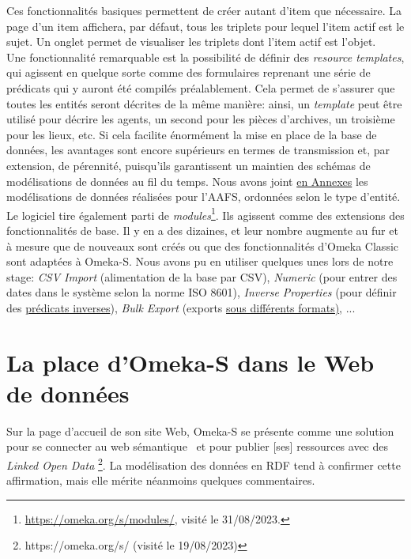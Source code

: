 \documentclass[a4paper,12pt,twoside]{book}
\begin{document}
Ces fonctionnalités basiques permettent de créer autant d'item que nécessaire. La page d'un item affichera, par défaut, tous les triplets pour lequel l'item actif est le sujet. Un onglet permet de visualiser les triplets dont l'item actif est l'objet.\\

Une fonctionnalité remarquable est la possibilité de définir des \textit{resource templates}, qui agissent en quelque sorte comme des formulaires reprenant une série de prédicats qui y auront été compilés préalablement. Cela permet de s'assurer que toutes les entités seront décrites de la même manière: ainsi, un \textit{template} peut être utilisé pour décrire les agents, un second pour les pièces d'archives, un troisième pour les lieux, etc. Si cela facilite énormément la mise en place de la base de données, les avantages sont encore supérieurs en termes de transmission et, par extension, de pérennité, puisqu'ils garantissent un maintien des schémas de modélisations de données au fil du temps. Nous avons joint \hyperref[modelisations-AAFS]{en Annexes} les modélisations de données réalisées pour l'AAFS, ordonnées selon le type d'entité.\\


Le logiciel tire également parti de \textit{modules}\footnote{\url{https://omeka.org/s/modules/}, visité le 31/08/2023.}. Ils agissent comme des extensions des fonctionnalités de base. Il y en a des dizaines, et leur nombre augmente au fur et à mesure que de nouveaux sont créés ou que des fonctionnalités d'Omeka Classic sont adaptées à Omeka-S. Nous avons pu en utiliser quelques unes lors de notre stage: \textit{CSV Import} (alimentation de la base par CSV), \textit{Numeric} (pour entrer des dates dans le système selon la norme ISO 8601), \textit{Inverse Properties} (pour définir des \hyperref[liens-logiques]{prédicats inverses}), \textit{Bulk Export} (exports \hyperref[3-exportsOS]{sous différents formats)}, ...



\section{La place d'Omeka-S dans le Web de données}\label{omeka-dans-wdd}
Sur la page d'accueil de son site Web, Omeka-S se présente comme une solution pour se \og connecter au web sémantique \fg\ et pour \og publier [ses] ressources avec des \textit{Linked Open Data}\fg{} \footnote{https://omeka.org/s/ (visité le 19/08/2023)}. La modélisation des données en RDF tend à confirmer cette affirmation, mais elle mérite néanmoins quelques commentaires.\\
\end{document}
